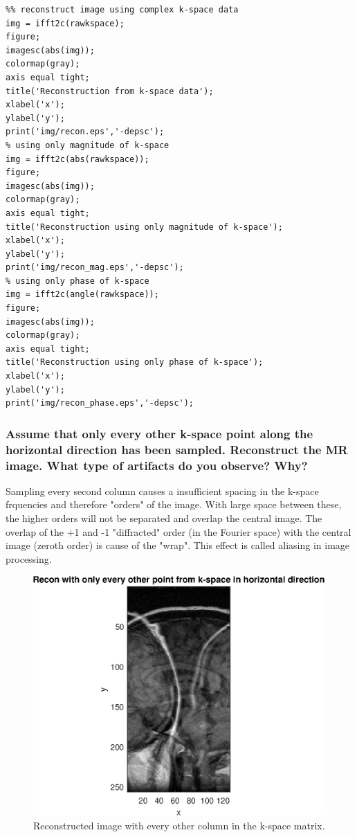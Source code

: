 \begin{lstlisting}
%% reconstruct image using complex k-space data
img = ifft2c(rawkspace);
figure;
imagesc(abs(img));
colormap(gray);
axis equal tight;
title('Reconstruction from k-space data');
xlabel('x');
ylabel('y');
print('img/recon.eps','-depsc');
% using only magnitude of k-space
img = ifft2c(abs(rawkspace));
figure;
imagesc(abs(img));
colormap(gray);
axis equal tight;
title('Reconstruction using only magnitude of k-space');
xlabel('x');
ylabel('y');
print('img/recon_mag.eps','-depsc');
% using only phase of k-space
img = ifft2c(angle(rawkspace));
figure;
imagesc(abs(img));
colormap(gray);
axis equal tight;
title('Reconstruction using only phase of k-space');
xlabel('x');
ylabel('y');
print('img/recon_phase.eps','-depsc');
\end{lstlisting}



\subsubsection{Assume that only every other k-space point along the horizontal direction has been sampled. Reconstruct the MR image. What type of artifacts do you observe? Why?}

Sampling every second column causes a insufficient spacing in the k-space frquencies and therefore "orders" of the image. With large space between these, the higher orders will not be separated and overlap the central image. The overlap of the +1 and -1 "diffracted" order (in the Fourier space) with the central image (zeroth order) is cause of the "wrap". This effect is called aliasing in image processing.


\begin{figure}[h!]
    \centering
    \includegraphics[width=.8\linewidth] {./homework4/img/recon_every2nd.eps}
    \caption{Reconstructed image with every other column in the k-space matrix.}
    \label{fig:recon_phase}
\end{figure}




